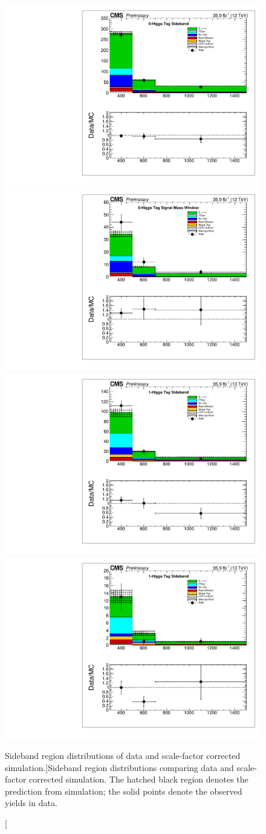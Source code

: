 \begin{figure}
\centering
\includegraphics[trim={5px 5px 5px 5px},clip,width=0.425\linewidth]{figs/Unblinding_antitagSB.pdf}
\includegraphics[trim={5px 5px 5px 5px},clip,width=0.425\linewidth]{figs/Unblinding_antitagSR.pdf}\\
\includegraphics[trim={5px 5px 5px 5px},clip,width=0.425\linewidth]{figs/Unblinding_tagSB.pdf}
\includegraphics[trim={5px 5px 5px 5px},clip,width=0.425\linewidth]{figs/Unblinding_doubletagSB.pdf}\\
\caption
[Sideband region \ptmiss distributions of data and scale-factor corrected simulation.]{Sideband region \ptmiss distributions comparing data and scale-factor corrected simulation. The hatched black region denotes the prediction from simulation; the solid points denote the observed yields in data.}
\label{fig:UnblindCR}
\end{figure}


